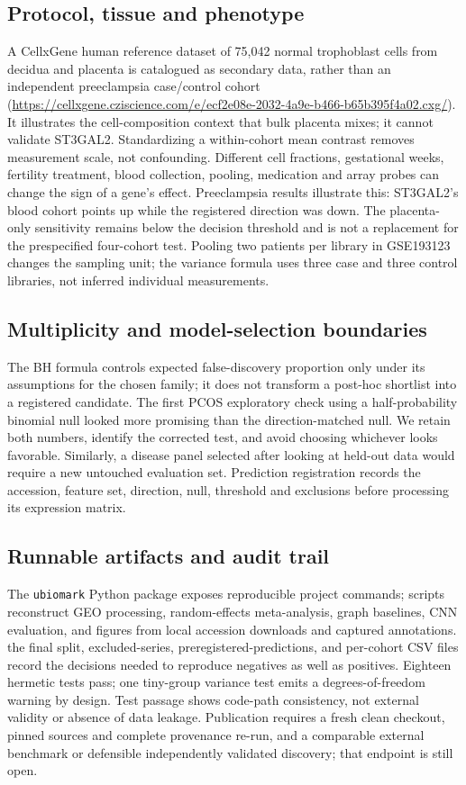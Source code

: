 \documentclass[11pt,a4paper]{article}
\begin{document}
\subsection{Protocol, tissue and phenotype}
A CellxGene human reference dataset of 75,042 normal trophoblast cells from decidua and placenta is catalogued as secondary data, rather than an independent preeclampsia case/control cohort (\url{https://cellxgene.cziscience.com/e/ecf2e08e-2032-4a9e-b466-b65b395f4a02.cxg/}). It illustrates the cell-composition context that bulk placenta mixes; it cannot validate ST3GAL2. Standardizing a within-cohort mean contrast removes measurement scale, not confounding. Different cell fractions, gestational weeks, fertility treatment, blood collection, pooling, medication and array probes can change the sign of a gene's effect. Preeclampsia results illustrate this: ST3GAL2's blood cohort points up while the registered direction was down. The placenta-only sensitivity remains below the decision threshold and is not a replacement for the prespecified four-cohort test. Pooling two patients per library in GSE193123 changes the sampling unit; the variance formula uses three case and three control libraries, not inferred individual measurements.

\subsection{Multiplicity and model-selection boundaries}
The BH formula controls expected false-discovery proportion only under its assumptions for the chosen family; it does not transform a post-hoc shortlist into a registered candidate. The first PCOS exploratory check using a half-probability binomial null looked more promising than the direction-matched null. We retain both numbers, identify the corrected test, and avoid choosing whichever looks favorable. Similarly, a disease panel selected after looking at held-out data would require a new untouched evaluation set. Prediction registration records the accession, feature set, direction, null, threshold and exclusions before processing its expression matrix.

\subsection{Runnable artifacts and audit trail}
The \texttt{ubiomark} Python package exposes reproducible project commands; scripts reconstruct GEO processing, random-effects meta-analysis, graph baselines, CNN evaluation, and figures from local accession downloads and captured annotations. the final split, excluded-series, preregistered-predictions, and per-cohort CSV files record the decisions needed to reproduce negatives as well as positives. Eighteen hermetic tests pass; one tiny-group variance test emits a degrees-of-freedom warning by design. Test passage shows code-path consistency, not external validity or absence of data leakage. Publication requires a fresh clean checkout, pinned sources and complete provenance re-run, and a comparable external benchmark or defensible independently validated discovery; that endpoint is still open.
\end{document}

